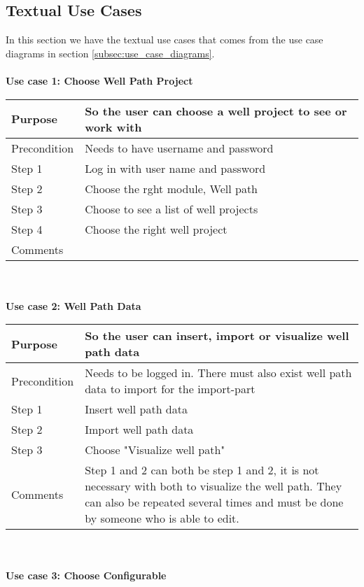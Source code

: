 \documentclass{report}
\begin{document}
\subsection{Textual Use Cases} \label{subsec:textual_use_cases}
In this section we have the textual use cases that comes from the use case diagrams in section \ref{subsec:use_case_diagrams}.\\\\
\textbf{Use case 1: Choose Well Path Project}\\
\begin{tabular}{| p{2 cm} | p{9 cm}|} \hline
Purpose & So the user can choose a well project to see or work with \\ \hline
Precondition & Needs to have username and password  \\ \hline
Step 1 & Log in with user name and password  \\ \hline
Step 2 & Choose the rght module, Well path   \\ \hline
Step 3 & Choose to see a list of well projects   \\ \hline
Step 4 & Choose the right well project \\ \hline
Comments &   \\ \hline
\end{tabular}\\\\
\textbf{Use case 2: Well Path Data}\\
\begin{tabular}{| p{2 cm} | p{9 cm}|} \hline
Purpose & So the user can insert, import or visualize well path data \\ \hline
Precondition & Needs to be logged in. There must also exist well path data to import for the import-part  \\ \hline
Step 1 & Insert well path data \\ \hline
Step 2 & Import well path data \\ \hline
Step 3 & Choose "Visualize well path"  \\ \hline 
Comments & Step 1 and 2 can both be step 1 and 2, it is not necessary with both to visualize the well path. They can also be repeated several times and must be done by someone who is able to edit. \\ \hline %
\end{tabular}\\\\
\textbf{Use case 3: Choose Configurable}\\
\end{document}
